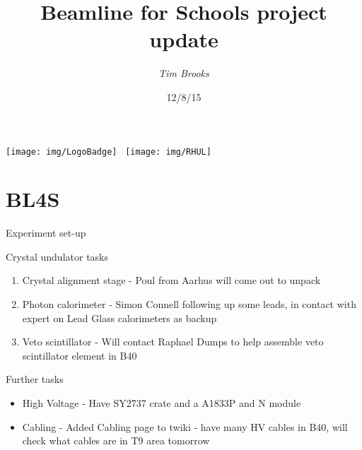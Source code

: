 \documentclass{beamer}
\title[Beamline for Schools\hspace{2em}\insertframenumber/
\inserttotalframenumber]{Beamline for Schools project update}
\author{\emph{Tim Brooks}}
\institute{CERN / RHUL}
\date{12/8/15}
\begin{document}
\begin{frame}
\titlepage{}
\centering
\texttt{[image: img/LogoBadge]}
\,
\texttt{[image: img/RHUL]}
\end{frame}

\section{BL4S}

\begin{frame}{Experiment set-up}
\begin{figure}\centering
    
\end{figure}
\end{frame}

\begin{frame}{Crystal undulator tasks}
\begin{enumerate}
    \item Crystal alignment stage - Poul from Aarhus will come out to unpack
    \item Photon calorimeter - Simon Connell following up some leads, in contact with expert on Lead Glass calorimeters as backup
    \item Veto scintillator - Will contact Raphael Dumps to help assemble veto scintillator element in B40
\end{enumerate}
\end{frame}

\begin{frame}{Further tasks}
\begin{itemize}
    \item High Voltage - Have SY2737 crate and a A1833P and N module
    \item Cabling - Added Cabling page to twiki - have many HV cables in B40, will check what cables are in T9 area tomorrow
\end{itemize}
\end{frame}
\end{document}
